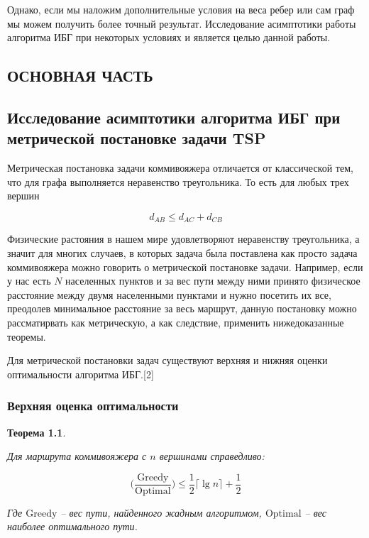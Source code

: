 \documentclass[a4paper, 14pt]{extarticle}
\numberwithin{equation}{section}
\newtheorem{theorem}{Теорема}[section]
\begin{document}
Однако, если мы наложим дополнительные условия на веса ребер или сам граф мы можем получить более точный результат. Исследование асимптотики работы алгоритма ИБГ при некоторых условиях и является целью данной работы. \newline

\newpage

\begin{center}
\chapter{\textbf{ОСНОВНАЯ ЧАСТЬ}}
\end{center}

\setcounter{section}{0}


\section{Исследование асимптотики алгоритма ИБГ при метрической постановке задачи TSP}

Метрическая постановка задачи коммивояжера отличается от классической тем, что для графа выполняется неравенство треугольника. То есть для любых трех вершин

\begin{equation*}
d_{AB} \leqslant d_{AC} + d_{CB}
\end{equation*}

Физические растояния в нашем мире удовлетворяют неравенству треугольника, а значит для многих случаев, в которых задача была поставлена как просто задача коммивояжера можно говорить о метрической постановке задачи. Например, если у нас есть $N$ населенных пунктов и за вес пути между ними принято физическое расстояние между двумя  населенными пунктами и нужно посетить их все, преодолев минимальное расстояние за весь маршрут, данную постановку можно рассматирвать как метрическую, а как следствие, применить нижедоказанные теоремы.

Для метрической постановки задач существуют верхняя и нижняя оценки оптимальности алгоритма ИБГ.[2] \\


\subsection{Верхняя оценка оптимальности}

\begin{theorem}
\label{theoremonemetric}

Для маршрута коммивояжера с $n$ вершинами справедливо:

\begin{equation*}
	\Big(\frac{\mathrm{Greedy}}{\mathrm{Optimal}}\Big) \leqslant \frac{1}{2}\lceil{\lg n}\rceil + \frac{1}{2}
\end{equation*}

Где $\mathrm{Greedy}$ -- вес пути, найденного жадным алгоритмом, $\mathrm{Optimal}$ -- вес наиболее оптимального пути.

\end{theorem}
\end{document}
